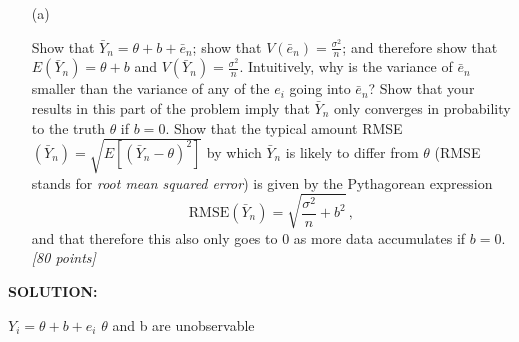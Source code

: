 \documentclass[12pt]{article}
\begin{document}
\begin{itemize}

\item[(a)]

Show that $\bar{ Y }_n = \theta + b + \bar{ e }_n$; show that $V \! \left( \bar{ e }_n \right) = \frac{ \sigma^2 }{ n }$; and therefore show that $E \! \left( \bar{ Y }_n \right) = \theta + b$ and $V \! \left( \bar{ Y }_n \right) = \frac{ \sigma^2 }{ n }$. Intuitively, why is the variance of $\bar{ e }_n$ smaller than the variance of any of the $e_i$ going into $\bar{ e }_n$? Show that your results in this part of the problem imply that $\bar{ Y }_n$ only converges in probability to the truth $\theta$ if $b = 0$. Show that the typical amount RMSE$\left( \bar{ Y }_n \right) = \sqrt{ E \left[ \left( \bar{ Y }_n - \theta \right)^2 \right] }$ by which $\bar{ Y }_n$ is likely to differ from $\theta$ (RMSE stands for \textit{root mean squared error}) is given by the Pythagorean expression
\begin{equation} \label{ph-3}
\text{RMSE} \left( \bar{ Y }_n \right) = \sqrt{ \frac{ \sigma^2 }{ n } + b^2 } \, ,
\end{equation}
and that therefore this also only goes to 0 as more data accumulates if $b = 0$. \textit{[80 points]}

\end{itemize}

\textbf{SOLUTION: }



$Y_i = \theta + b + e_i$
\newline $\theta$ and b are unobservable 
\end{document}
